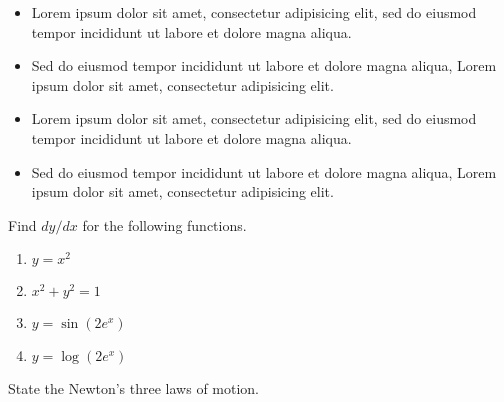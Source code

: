 \lipsum[7-8]
\begin{summary}
  \begin{itemize}
  \item Lorem ipsum dolor sit amet, consectetur adipisicing elit, sed do eiusmod tempor incididunt ut labore et dolore magna aliqua.
  \item Sed do eiusmod tempor incididunt ut labore et dolore magna aliqua, Lorem ipsum dolor sit amet, consectetur adipisicing elit.
  \item Lorem ipsum dolor sit amet, consectetur adipisicing elit, sed do eiusmod tempor incididunt ut labore et dolore magna aliqua.
  \item Sed do eiusmod tempor incididunt ut labore et dolore magna aliqua, Lorem ipsum dolor sit amet, consectetur adipisicing elit.
  \end{itemize}
\end{summary}

\begin{problems}
  \item Find $dy/dx$ for the following functions.
  \begin{enumerate}
    \item $y=x^2$
    \item $x^{2}+y^{2}=1$
    \item $y=\sin(2e^x)$
    \item $y=\log(2e^x)$
  \end{enumerate}
  \item State the Newton's three laws of motion.
\end{problems}
